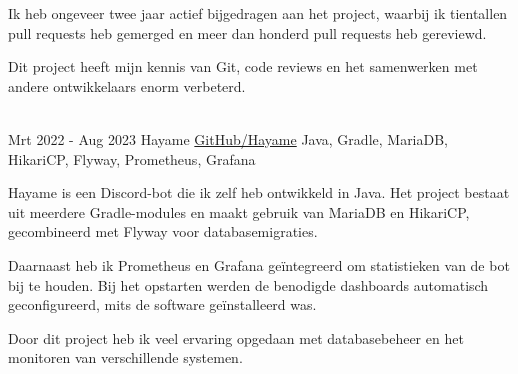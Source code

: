 \documentclass[letterpaper]{twentysecondcv_nederlands}
\begin{document}
\begin{twenty}
{        Ik heb ongeveer twee jaar actief bijgedragen aan het project,
        waarbij ik tientallen pull requests heb gemerged en meer dan
        honderd pull requests heb gereviewd.

        Dit project heeft mijn kennis van Git, code reviews en het
        samenwerken met andere ontwikkelaars enorm verbeterd.
    }\\

    \twentyitem
    {Mrt 2022 -}
    {Aug 2023}
    {Hayame}
    {\href{https://github.com/Tais993/Hayame}{GitHub/Hayame}}
    {Java, Gradle, MariaDB, HikariCP, Flyway, Prometheus, Grafana}
    {
        Hayame is een Discord-bot die ik zelf heb ontwikkeld in Java.
        Het project bestaat uit meerdere Gradle-modules en maakt gebruik
        van MariaDB en HikariCP, gecombineerd met Flyway voor
        databasemigraties.

        Daarnaast heb ik Prometheus en Grafana geïntegreerd om
        statistieken van de bot bij te houden. Bij het opstarten werden
        de benodigde dashboards automatisch geconfigureerd, mits de
        software geïnstalleerd was.

        Door dit project heb ik veel ervaring opgedaan met databasebeheer
        en het monitoren van verschillende systemen.
    }

\end{twenty}

\vspace{-10mm}
\end{document}
